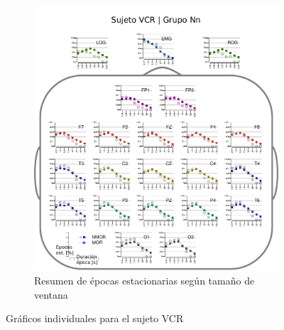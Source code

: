 
\begin{figure}
\ContinuedFloat
\begin{subfigure}{\linewidth}
\centering
\includegraphics[width=.9\linewidth]{./img_resultados/cabeza_VCR.pdf}
\caption{Resumen de épocas estacionarias según tamaño de ventana}
\end{subfigure}
\caption{Gráficos individuales para el sujeto VCR}
\end{figure}


